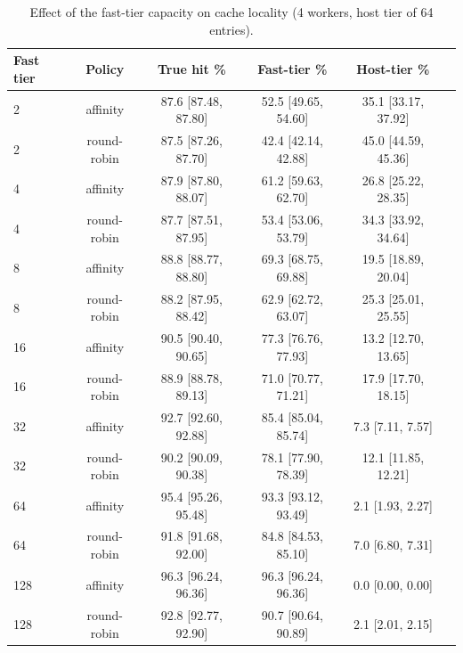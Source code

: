 \begin{table}[t]
\centering
\scriptsize
\setlength{\tabcolsep}{2.5pt}
\caption{Effect of the fast-tier capacity on cache locality (4 workers, host tier of 64 entries).}
\label{tab:capacity}
\begin{tabular}{lccccc}
\toprule
Fast tier & Policy & True hit \% & Fast-tier \% & Host-tier \% \\
\midrule
2 & affinity & 87.6 \tiny [87.48, 87.80] & 52.5 \tiny [49.65, 54.60] & 35.1 \tiny [33.17, 37.92] \\
2 & round-robin & 87.5 \tiny [87.26, 87.70] & 42.4 \tiny [42.14, 42.88] & 45.0 \tiny [44.59, 45.36] \\
4 & affinity & 87.9 \tiny [87.80, 88.07] & 61.2 \tiny [59.63, 62.70] & 26.8 \tiny [25.22, 28.35] \\
4 & round-robin & 87.7 \tiny [87.51, 87.95] & 53.4 \tiny [53.06, 53.79] & 34.3 \tiny [33.92, 34.64] \\
8 & affinity & 88.8 \tiny [88.77, 88.80] & 69.3 \tiny [68.75, 69.88] & 19.5 \tiny [18.89, 20.04] \\
8 & round-robin & 88.2 \tiny [87.95, 88.42] & 62.9 \tiny [62.72, 63.07] & 25.3 \tiny [25.01, 25.55] \\
16 & affinity & 90.5 \tiny [90.40, 90.65] & 77.3 \tiny [76.76, 77.93] & 13.2 \tiny [12.70, 13.65] \\
16 & round-robin & 88.9 \tiny [88.78, 89.13] & 71.0 \tiny [70.77, 71.21] & 17.9 \tiny [17.70, 18.15] \\
32 & affinity & 92.7 \tiny [92.60, 92.88] & 85.4 \tiny [85.04, 85.74] & 7.3 \tiny [7.11, 7.57] \\
32 & round-robin & 90.2 \tiny [90.09, 90.38] & 78.1 \tiny [77.90, 78.39] & 12.1 \tiny [11.85, 12.21] \\
64 & affinity & 95.4 \tiny [95.26, 95.48] & 93.3 \tiny [93.12, 93.49] & 2.1 \tiny [1.93, 2.27] \\
64 & round-robin & 91.8 \tiny [91.68, 92.00] & 84.8 \tiny [84.53, 85.10] & 7.0 \tiny [6.80, 7.31] \\
128 & affinity & 96.3 \tiny [96.24, 96.36] & 96.3 \tiny [96.24, 96.36] & 0.0 \tiny [0.00, 0.00] \\
128 & round-robin & 92.8 \tiny [92.77, 92.90] & 90.7 \tiny [90.64, 90.89] & 2.1 \tiny [2.01, 2.15] \\
\bottomrule
\end{tabular}
\end{table}
